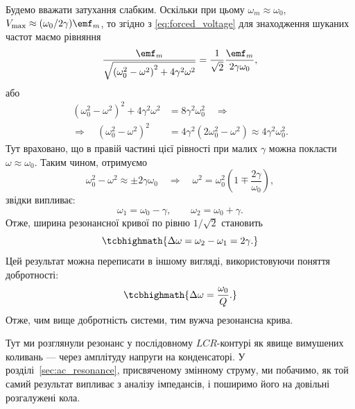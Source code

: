 Будемо вважати затухання слабким. Оскільки при цьому $\omega_m \approx \omega_0$,
$V_{\max} \approx (\omega_0/2\gamma)\emf_m$, то згідно з \eqref{eq:forced_voltage} для знаходження шуканих частот маємо рівняння
\begin{equation}\label{eq:half_power_equation}
	\frac{\emf_m}{\sqrt{\left(\omega_0^2 - \omega^2\right)^2 + 4\gamma^2\omega^2}}
	= \frac{1}{\sqrt{2}}\frac{\emf_m}{2\gamma\omega_0},
\end{equation}
або
\begin{equation}\label{eq:half_power_squared}
	\begin{aligned}
		\left(\omega_0^2 - \omega^2\right)^2 + 4\gamma^2\omega^2 & = 8\gamma^2\omega_0^2 \quad\Rightarrow                                      \\
		\Rightarrow\quad \left(\omega_0^2 - \omega^2\right)^2    & = 4\gamma^2\left(2\omega_0^2 - \omega^2\right) \approx 4\gamma^2\omega_0^2.
	\end{aligned}
\end{equation}
Тут враховано, що в правій частині цієї рівності при малих $\gamma$ можна
покласти $\omega \approx \omega_0$. Таким чином, отримуємо
\begin{equation}\label{eq:frequency_shift}
	\omega_0^2 - \omega^2 \approx \pm 2\gamma\omega_0
	\quad\Rightarrow\quad
	\omega^2 = \omega_0^2\left(1 \mp \frac{2\gamma}{\omega_0}\right),
\end{equation}
звідки випливає:
\begin{equation}\label{eq:omega1_omega2}
	\omega_1 = \omega_0 - \gamma, \qquad \omega_2 = \omega_0 + \gamma.
\end{equation}
Отже, ширина резонансної кривої по рівню $1/\sqrt{2}$ становить
\begin{equation}\label{eq:resonance_width}
	\tcbhighmath{
		\Delta\omega = \omega_2 - \omega_1 = 2\gamma.
	}
\end{equation}
Цей результат можна переписати в іншому вигляді, використовуючи поняття
добротності:
\begin{equation}\label{eq:resonance_width_Q}
	\tcbhighmath{
		\Delta\omega = \frac{\omega_0}{Q}.
	}
\end{equation}
Отже, чим вище добротність системи, тим вужча резонансна
крива.

Тут ми розглянули резонанс у послідовному $LCR$-контурі як явище вимушених коливань --- через амплітуду напруги на конденсаторі. У розділі~\ref{sec:ac_resonance}, присвяченому змінному струму, ми побачимо, як той самий результат випливає з аналізу імпедансів, і поширимо його на довільні розгалужені кола.

